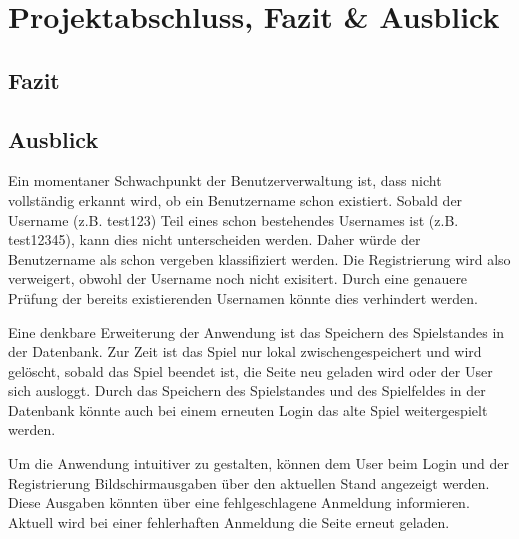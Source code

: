 
\chapter{Projektabschluss, Fazit \& Ausblick}\label{cha:Schlussbetrachtung}
\section{Fazit}\label{sec:Fazit}

\section{Ausblick}\label{sec:Ausblick}
Ein momentaner Schwachpunkt der Benutzerverwaltung ist, dass nicht vollständig erkannt wird, ob ein Benutzername schon existiert. Sobald der Username (z.B. test123) Teil eines schon bestehendes Usernames ist (z.B. test12345), kann dies nicht unterscheiden werden. Daher würde der Benutzername als schon vergeben klassifiziert werden. Die Registrierung wird also verweigert, obwohl der Username noch nicht exisitert. Durch eine genauere Prüfung der bereits existierenden Usernamen könnte dies verhindert werden.

Eine denkbare Erweiterung der Anwendung ist das Speichern des Spielstandes in der Datenbank. Zur Zeit ist das Spiel nur lokal zwischengespeichert und wird gelöscht, sobald das Spiel beendet ist, die Seite neu geladen wird oder der User sich ausloggt. Durch das Speichern des Spielstandes und des Spielfeldes in der Datenbank könnte auch bei einem erneuten Login das alte Spiel weitergespielt werden.

Um die Anwendung intuitiver zu gestalten, können dem User beim Login und der Registrierung Bildschirmausgaben über den aktuellen Stand angezeigt werden. Diese Ausgaben könnten über eine fehlgeschlagene Anmeldung informieren. Aktuell wird bei einer fehlerhaften Anmeldung die Seite erneut geladen. 